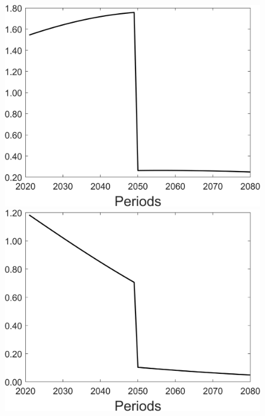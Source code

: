 \begin{figure}[h!!]
\begin{minipage}[]{0.32\textwidth}
	\end{minipage}
	\begin{minipage}[]{0.32\textwidth}
		\includegraphics[width=1\textwidth]{../../codding_model/Own/figures/Rep_agent/staticonlyRam_separate_xc_periods59_eppsilon0.40_zeta1.40_Ad08_Ac04_thetac0.70_thetad0.56_HetGrowth1_tauul0.181_util0_withtarget1_lgd0.png}
	\end{minipage}
\begin{minipage}[]{0.32\textwidth}
\includegraphics[width=1\textwidth]{../../codding_model/Own/figures/Rep_agent/staticonlyRam_separate_xd_periods59_eppsilon0.40_zeta1.40_Ad08_Ac04_thetac0.70_thetad0.56_HetGrowth1_tauul0.181_util0_withtarget1_lgd0.png}

\end{minipage}
\end{figure}
